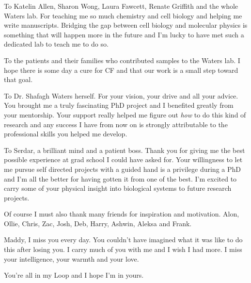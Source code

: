 To Katelin Allen, Sharon Wong, Laura Fawcett, Renate Griffith and the whole Waters lab. For teaching me so much chemistry and cell biology and helping me write manuscripts. Bridging the gap between cell biology and molecular physics is something that will happen more in the future and I'm lucky to have met such a dedicated lab to teach me to do so.

To the patients and their families who contributed samples to the Waters lab. I hope there is some day a cure for CF and that our work is a small step toward that goal.

To Dr. Shafagh Waters herself. For your vision, your drive and all your advice. You brought me a truly fascinating PhD project and I benefited greatly from your mentorship. Your support really helped me figure out \textit{how} to do this kind of research and any success I have from now on is strongly attributable to the professional skills you helped me develop.

To Serdar, a brilliant mind and a patient boss. Thank you for giving me the best possible experience at grad school I could have asked for. Your willingness to let me pursue self directed projects with a guided hand is a privilege during a PhD and I'm all the better for having gotten it from one of the best. I'm excited to carry some of your physical insight into biological systems to future research projects. 

Of course I must also thank many friends for inspiration and motivation. Alon, Ollie, Chris, Zac, Josh, Deb, Harry, Ashwin, Aleksa and Frank.

Maddy, I miss you every day. You couldn't have imagined what it was like to do this after losing you. I carry much of you with me and I wish I had more. I miss your intelligence, your warmth and your love.

You're all in my Loop and I hope I'm in yours.

